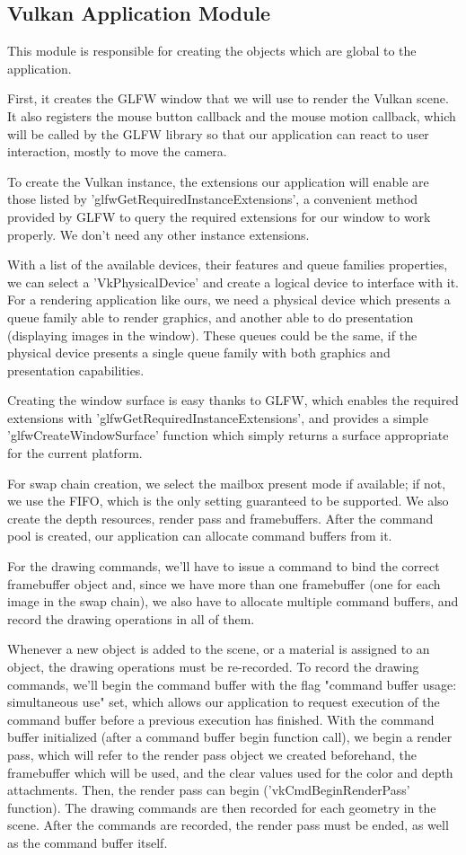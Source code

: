 \subsection{Vulkan Application Module}
This module is responsible for creating the objects which are global to the application.

First, it creates the GLFW window that we will use to render the Vulkan scene. It also registers the mouse button callback and the mouse motion callback, which will be called by the GLFW library so that our application can react to user interaction, mostly to move the camera.

To create the Vulkan instance, the extensions our application will enable are those listed by 'glfwGetRequiredInstanceExtensions', a convenient method provided by GLFW to query the required extensions for our window to work properly. We don't need any other instance extensions.

With a list of the available devices, their features and queue families properties, we can select a 'VkPhysicalDevice' and create a logical device to interface with it. For a rendering application like ours, we need a physical device which presents a queue family able to render graphics, and another able to do presentation (displaying images in the window). These queues could be the same, if the physical device presents a single queue family with both graphics and presentation capabilities.

Creating the window surface is easy thanks to GLFW, which enables the required extensions with 'glfwGetRequiredInstanceExtensions', and provides a simple 'glfwCreateWindowSurface' function which simply returns a surface appropriate for the current platform.

For swap chain creation, we select the mailbox present mode if available; if not, we use the FIFO, which is the only setting guaranteed to be supported. We also create the depth resources, render pass and framebuffers. After the command pool is created, our application can allocate command buffers from it.

For the drawing commands, we'll have to issue a command to bind the correct framebuffer object and, since we have more than one framebuffer (one for each image in the swap chain), we also have to allocate multiple command buffers, and record the drawing operations in all of them.

Whenever a new object is added to the scene, or a material is assigned to an object, the drawing operations must be re-recorded. To record the drawing commands, we'll begin the command buffer with the flag "command buffer usage: simultaneous use" set, which allows our application to request execution of the command buffer before a previous execution has finished. With the command buffer initialized (after a command buffer begin function call), we begin a render pass, which will refer to the render pass object we created beforehand, the framebuffer which will be used, and the clear values used for the color and depth attachments. Then, the render pass can begin ('vkCmdBeginRenderPass' function). The drawing commands are then recorded for each geometry in the scene. After the commands are recorded, the render pass must be ended, as well as the command buffer itself.

